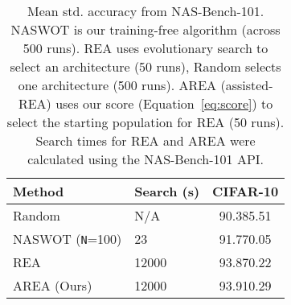 \documentclass{article}
\begin{document}
\begin{table}
\caption{Mean  std. accuracy from NAS-Bench-101. NASWOT is our training-free algorithm (across 500 runs). REA uses evolutionary search to select an architecture (50 runs), Random selects one architecture (500 runs). AREA (assisted-REA) uses our score (Equation~\ref{eq:score}) to select the starting population for REA (50 runs).  Search times for REA and AREA were calculated using the NAS-Bench-101 API.}
\vspace{2mm}
\label{table:benchmarking101}
\centering
    \begin{tabular}{@{}llc@{}} \hline 
    Method & Search (s)  & CIFAR-10 \\
    \midrule
    Random & N/A &  90.385.51 \\
    NASWOT (\texttt{N}=100) & 23  & 91.770.05 \\
    REA      &  12000  & 93.870.22 \\
    AREA (Ours) &  12000  & 93.910.29 \\
    \midrule
    \end{tabular}
\end{table}
\end{document}
